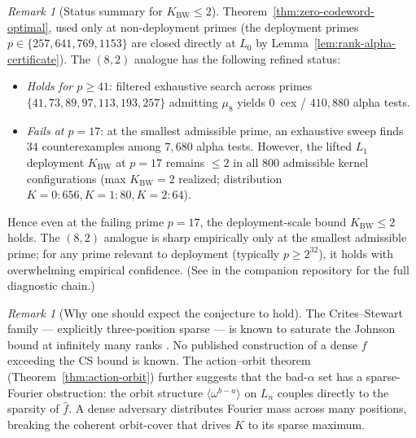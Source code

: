 \documentclass[11pt]{article}
\theoremstyle{definition}
\theoremstyle{remark}
\newtheorem{remark}[theorem]{Remark}
\begin{document}
\begin{remark}[Status summary for $K_{\mathrm{BW}} \leq 2$]
Theorem~\ref{thm:zero-codeword-optimal}, used only at non-deployment
primes (the deployment primes $p \in \{257, 641, 769, 1153\}$ are
closed directly at $L_0$ by
Lemma~\ref{lem:rank-alpha-certificate}). The $(8, 2)$ analogue has the
following refined status:
\begin{itemize}[leftmargin=2em, nosep]
\item \emph{Holds for $p \geq 41$}: filtered exhaustive search across primes
$\{41, 73, 89, 97, 113, 193, 257\}$ admitting $\mu_8$ yields $0$~cex / $410{,}880$
alpha tests.
\item \emph{Fails at $p = 17$}: at the smallest admissible prime, an exhaustive
sweep finds $34$ counterexamples among $7{,}680$ alpha tests.
However, the lifted $L_1$ deployment $K_{\mathrm{BW}}$ at $p = 17$ remains
$\leq 2$ in all $800$ admissible kernel configurations (max $K_{\mathrm{BW}}=2$
realized; distribution $K=0:656, K=1:80, K=2:64$).
\end{itemize}
Hence even at the failing prime $p = 17$, the deployment-scale bound
$K_{\mathrm{BW}} \leq 2$ holds. The $(8, 2)$ analogue is sharp empirically
only at the smallest admissible prime; for any prime relevant to deployment
(typically $p \geq 2^{32}$), it holds with overwhelming empirical
confidence. (See \cite{CompanionRepo} in the companion repository for the
full diagnostic chain.)
\end{remark}

\begin{remark}[Why one should expect the conjecture to hold]
\label{rem:sparse-worst-heuristic}
The Crites--Stewart family --- explicitly three-position sparse --- is
known to saturate the Johnson bound at infinitely many ranks
\cite{CritesStewart2025}. No published construction of a dense $f$
exceeding the CS bound is known. The
action--orbit theorem (Theorem~\ref{thm:action-orbit}) further suggests
that the bad-$\alpha$ set has a sparse-Fourier obstruction: the orbit
structure $\langle \omega^{b - a} \rangle$ on $L_n$ couples directly to
the sparsity of $\hat f$. A dense adversary distributes Fourier mass
across many positions, breaking the coherent orbit-cover that drives
$K$ to its sparse maximum.
\end{remark}
\end{document}
